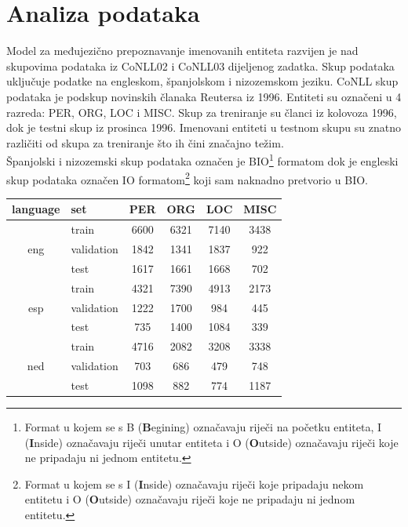 \documentclass[times, utf8, seminar]{fer}
\begin{document}
\chapter{Analiza podataka}
Model za međujezično prepoznavanje imenovanih entiteta razvijen je nad skupovima podataka iz CoNLL02 i CoNLL03 dijeljenog zadatka. Skup podataka uključuje podatke na engleskom, španjolskom i nizozemskom jeziku. CoNLL skup podataka je podskup novinskih članaka Reutersa iz 1996. Entiteti su označeni u 4 razreda: PER, ORG, LOC i MISC. Skup za treniranje su članci iz kolovoza 1996, dok je testni skup iz prosinca 1996. Imenovani entiteti u testnom skupu su znatno različiti od skupa za treniranje što ih čini značajno težim.\citep{Ratinov:2009:DCM:1596374.1596399} \\
\indent Španjolski i nizozemski skup podataka označen je BIO\footnote{Format u kojem se s B (\textbf{B}egining) označavaju riječi na početku entiteta, I (\textbf{I}nside) označavaju riječi unutar entiteta i O (\textbf{O}utside) označavaju riječi koje ne pripadaju ni jednom entitetu.} formatom dok je engleski skup podataka označen IO formatom\footnote{Format u kojem se s I (\textbf{I}nside) označavaju riječi koje pripadaju nekom entitetu i O (\textbf{O}utside) označavaju riječi koje ne pripadaju ni jednom entitetu.} koji sam naknadno pretvorio u BIO.
\begin{center}
\begin{tabular}{ clcccc }
\hline
language & set & PER & ORG & LOC & MISC \\ \hline
\multirow{3}{*}{eng} & train & 6600 & 6321 & 7140 & 3438 \\
 & validation & 1842 & 1341 & 1837 & 922 \\
 & test & 1617 & 1661 & 1668 & 702 \\ \hline
\multirow{3}{*}{esp} & train & 4321 & 7390 & 4913 & 2173 \\
 & validation & 1222 & 1700 & 984 & 445\\
 & test & 735 & 1400 & 1084  & 339 \\ \hline
\multirow{3}{*}{ned} & train & 4716 & 2082 & 3208 & 3338 \\
 & validation & 703 & 686 & 479 & 748 \\
 & test & 1098 & 882 & 774 & 1187 \\ \hline
\end{tabular}
\end{center}
\end{document}
